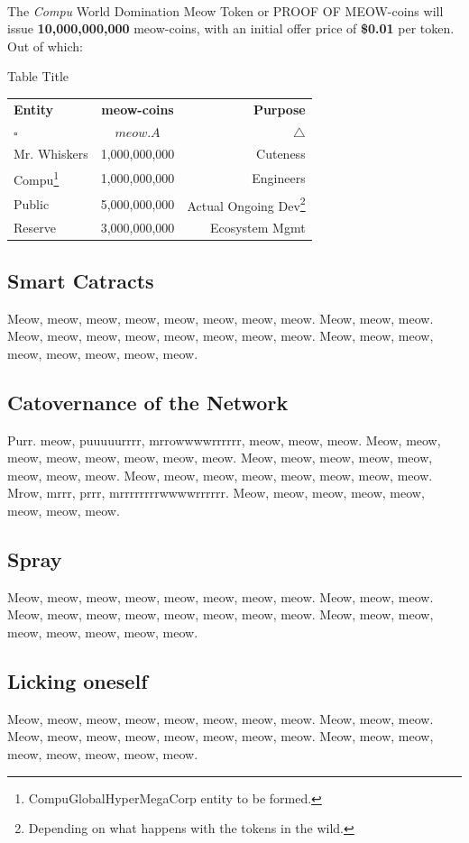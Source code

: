 \documentclass[9pt,oneside]{amsart}
\newcommand*\proofmeow{PROOF OF MEOW\textsuperscript{\textregistered}}
\newcommand*\lipsumeow{Meow, meow, meow, meow, meow, meow, meow, meow.  Meow, meow, meow. Meow, meow, meow, meow, meow, meow, meow, meow. Meow, meow, meow, meow, meow, meow, meow, meow. }
\newcommand*\lipsumeowpurr{Purr. meow, puuuuurrrr, mrrowwwwrrrrrr, meow, meow, meow. Meow, meow, meow, meow, meow, meow, meow, meow. Meow, meow, meow, meow, meow, meow, meow, meow. Meow, meow, meow, meow, meow, meow, meow, meow. Mrow, mrrr, prrr, mrrrrrrrrwwwwrrrrrr. Meow, meow, meow, meow, meow, meow, meow, meow.}
\begin{document}
\begin{multicols}{2}
The \textit{Compu} World Domination Meow Token or \proofmeow{}-coins will issue \textbf{10,000,000,000} meow-coins, with an initial offer price of \textbf{\$0.01} per token.  Out of which:
\\
\begin{center} \label{tab:table1}
\caption{Table Title}
\begin{tabular}{l|c|r} %
    \textbf{Entity} & \textbf{meow-coins} & \textbf{Purpose}\\
        $ \square $ & $ meow.A $ & $ \bigtriangleup $ \\
        \hline
        Mr. Whiskers & 1,000,000,000 & Cuteness \\
        Compu\footnote{CompuGlobalHyperMegaCorp entity to be formed.} & 1,000,000,000 & Engineers \\
        Public & 5,000,000,000 & Actual Ongoing Dev\footnote{Depending on what happens with the tokens in the wild.} \\
        Reserve & 3,000,000,000 & Ecosystem Mgmt \\
        \bottomrule[1.25pt]
    \end{tabular}
\end{center}

\subsection{Smart Catracts} \label{subsec:smart_contracts} 
 \lipsumeow{}

\subsection{Catovernance of the Network} \label{subsec:governance} 
 \lipsumeowpurr{}

\subsection{Spray} \label{fees} 
 \lipsumeow{}

\subsection{Licking oneself} \label{privacy} 
 \lipsumeow{}



\end{multicols}
\end{document}
